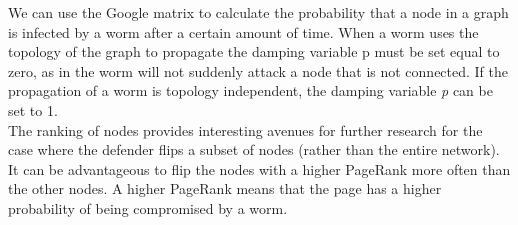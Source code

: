We can use the Google matrix to calculate the probability that a node in a graph is infected by a worm after a certain amount of time. When a worm uses the topology of the graph to propagate the damping variable p must be set equal to zero, as in the worm will not suddenly attack a node that is not connected. If the propagation of a worm is topology independent, the damping variable \textit{p} can be set to 1. \\
The ranking of nodes provides interesting avenues for further research for the case where the defender flips a subset of nodes (rather than the entire network). It can be advantageous to flip the nodes with a higher PageRank more often than the other nodes. A higher PageRank means that the page has a higher probability of being compromised by a worm. 


